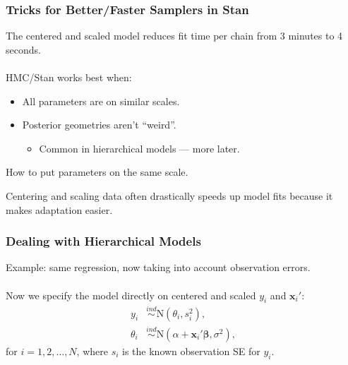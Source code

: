 \documentclass[xcolor=dvipsnames]{beamer}
\begin{document}
\begin{frame}[fragile]
\frametitle{Tricks for Better/Faster Samplers in Stan}
The centered and scaled model reduces fit time per chain from 3 minutes to 4 seconds.\\~\\

HMC/Stan works best when:
\begin{itemize}
\item All parameters are on similar scales.
\item Posterior geometries aren't ``weird''.
\begin{itemize}
\item Common in hierarchical models --- more later.
\end{itemize}
\end{itemize}
How to put parameters on the same scale.

Centering and scaling data often drastically speeds up model fits because it makes adaptation easier.
\end{frame}

\begin{frame}[fragile]
\frametitle{Dealing with Hierarchical Models}
Example: same regression, now taking into account observation errors.\\~\\

Now we specify the model directly on centered and scaled $y_i$ and $\bm{x}_i'$:
\begin{align*}
y_i &\stackrel{ind}{\sim} \mathrm{N}(\theta_i, s_i^2),\\
\theta_i &\stackrel{ind}{\sim} \mathrm{N}(\alpha + \bm{x}_i'\bm{\beta}, \sigma^2),
\end{align*}
for $i=1,2,\dots,N$, where $s_i$ is the known observation SE for $y_i$.
\end{frame}

\end{document}
